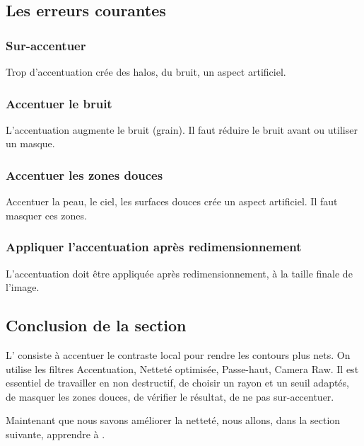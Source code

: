 \subsection{Les erreurs courantes}

\subsubsection{Sur-accentuer}

Trop d'accentuation crée des halos, du bruit, un aspect artificiel.

\subsubsection{Accentuer le bruit}

L'accentuation augmente le bruit (grain). Il faut réduire le bruit avant ou utiliser un masque.

\subsubsection{Accentuer les zones douces}

Accentuer la peau, le ciel, les surfaces douces crée un aspect artificiel. Il faut masquer ces zones.

\subsubsection{Appliquer l'accentuation après redimensionnement}

L'accentuation doit être appliquée après redimensionnement, à la taille finale de l'image.

\subsection*{Conclusion de la section}

L' consiste à accentuer le contraste local pour rendre les contours plus nets. On utilise les filtres Accentuation, Netteté optimisée, Passe-haut, Camera Raw. Il est essentiel de travailler en non destructif, de choisir un rayon et un seuil adaptés, de masquer les zones douces, de vérifier le résultat, de ne pas sur-accentuer.

Maintenant que nous savons améliorer la netteté, nous allons, dans la section suivante, apprendre à .

